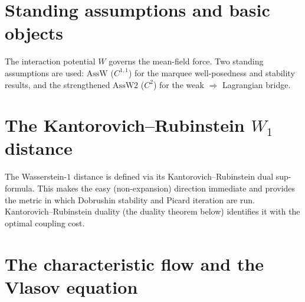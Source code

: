 


\chapter{Standing assumptions and basic objects}

The interaction potential $W$ governs the mean-field force.  Two standing assumptions are
used: $\mathrm{AssW}$ ($C^{1,1}$) for the marquee well-posedness and stability results, and the
strengthened $\mathrm{AssW2}$ ($C^2$) for the weak $\Rightarrow$ Lagrangian bridge.


\chapter[The Kantorovich--Rubinstein W1 distance]{The Kantorovich--Rubinstein $W_1$ distance}

The Wasserstein-$1$ distance is defined via its Kantorovich--Rubinstein dual sup-formula.  This
makes the easy (non-expansion) direction immediate and provides the metric in which Dobrushin
stability and Picard iteration are run.  Kantorovich--Rubinstein duality (the duality theorem below)
identifies it with the optimal coupling cost.


\chapter{The characteristic flow and the Vlasov equation}

